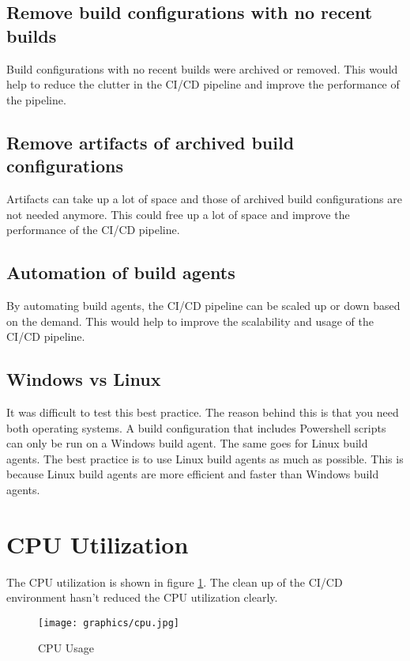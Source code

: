 \subsection{Remove build configurations with no recent builds}%
\label{sub:remove-build-configurations-with-no-recent-builds}
Build configurations with no recent builds were archived or removed. This would help to reduce the clutter in the CI/CD pipeline and improve the performance of the pipeline.

\subsection{Remove artifacts of archived build configurations}%
\label{sub:remove-artifacts-of-archived-build-configurations}
Artifacts can take up a lot of space and those of archived build configurations are not needed anymore. This could free up a lot of space and improve the performance of the CI/CD pipeline.

\subsection{Automation of build agents}%
\label{sub:automation-of-build-agents}
By automating build agents, the CI/CD pipeline can be scaled up or down based on the demand. This would help to improve the scalability and usage of the CI/CD pipeline.

\subsection{Windows vs Linux}%
\label{sub:windows-vs-linux}
It was difficult to test this best practice. The reason behind this is that you need both operating systems. A build configuration that includes Powershell scripts can only be run on a Windows build agent. The same goes for Linux build agents. The best practice is to use Linux build agents as much as possible. This is because Linux build agents are more efficient and faster than Windows build agents.


\section{CPU Utilization}%
\label{sec:cpu-utilization}

The CPU utilization is shown in figure \ref{fig:cpu}. The clean up of the CI/CD environment hasn't reduced the CPU utilization clearly.

\begin{figure}[CPU]
    \centering
    \texttt{[image: graphics/cpu.jpg]}
    \caption{CPU Usage}
    \label{fig:cpu}
\end{figure}

